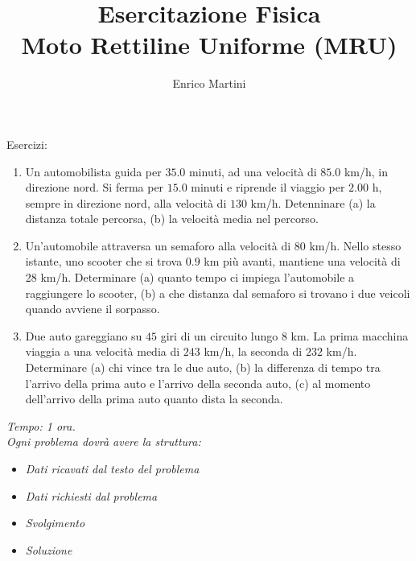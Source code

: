 \documentclass[a4paper]{article}
\title{Esercitazione Fisica\\ Moto Rettiline Uniforme (MRU)}
\author{Enrico Martini}
\begin{document}
\maketitle
\thispagestyle{empty}

Esercizi:

\begin{enumerate}
    \item Un automobilista guida per $35.0$ minuti, ad una velocità
    di $85.0$ km/h, in direzione nord. Si ferma per
    $15.0$ minuti e riprende il viaggio per $2.00$ h, sempre in
    direzione nord, alla velocità di $130$ km/h. Detenninare
    (a) la distanza totale percorsa, (b) la velocità
    media nel percorso.
    \item Un'automobile attraversa un semaforo alla velocità di $80$ km/h. Nello stesso istante, uno scooter che si trova $0.9$ km più avanti, mantiene una velocità di 28 km/h. Determinare (a) quanto tempo ci impiega l'automobile a raggiungere lo scooter, (b) a che distanza dal semaforo si trovano i due veicoli quando avviene il sorpasso.
    \item Due auto gareggiano su $45$ giri di un circuito lungo $8$ km. La prima macchina viaggia a una velocità media di $243$ km/h, la seconda di $232$ km/h. Determinare (a) chi vince tra le due auto, (b) la differenza di tempo tra l'arrivo della prima auto e l'arrivo della seconda auto, (c) al momento dell'arrivo della prima auto quanto dista la seconda.
\end{enumerate}
\vspace{2cm}
\textit{Tempo: 1 ora.}
\\
\textit{Ogni problema dovrà avere la struttura:}
\begin{itemize}
    \item \textit{Dati ricavati dal testo del problema}
    \item \textit{Dati richiesti dal problema}
    \item \textit{Svolgimento}
    \item \textit{Soluzione}
\end{itemize}
\end{document}
